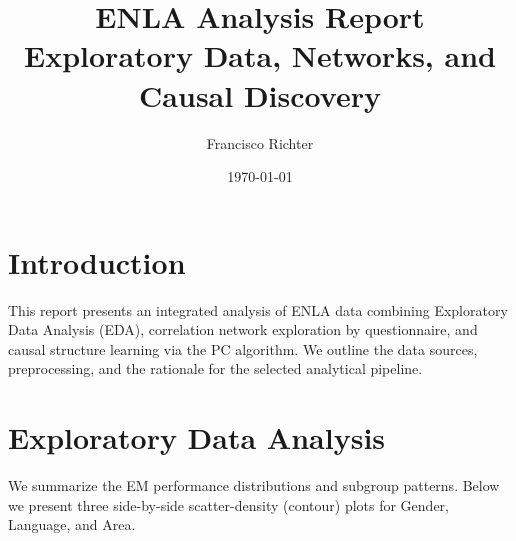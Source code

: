 \documentclass[11pt, a4paper]{article}
\title{ENLA Analysis Report\\\large Exploratory Data, Networks, and Causal Discovery}
\author{Francisco Richter}
\date{\today}
\begin{document}
\maketitle
\newpage

\section{Introduction}
This report presents an integrated analysis of ENLA data combining Exploratory Data Analysis (EDA), correlation network exploration by questionnaire, and causal structure learning via the PC algorithm. We outline the data sources, preprocessing, and the rationale for the selected analytical pipeline.

\section{Exploratory Data Analysis}
We summarize the EM performance distributions and subgroup patterns. Below we present three side-by-side scatter-density (contour) plots for Gender, Language, and Area.
\end{document}
